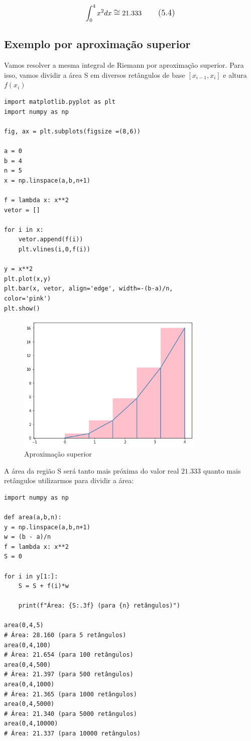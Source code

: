 \begin{equation}
\large \int_{0}^{4}x^2dx \cong 21.333
\tag{5.4}
\end{equation}

\subsection{Exemplo por aproximação superior}

Vamos resolver a mesma integral de Riemann por aproximação superior. Para isso, vamos dividir a área S em diversos retângulos de base $[x_{i-1},x_{i}]$ e altura $f(x_{i})$

\begin{verbatim}
import matplotlib.pyplot as plt
import numpy as np

fig, ax = plt.subplots(figsize =(8,6))

a = 0
b = 4
n = 5
x = np.linspace(a,b,n+1)

f = lambda x: x**2
vetor = []

for i in x:
	vetor.append(f(i))
	plt.vlines(i,0,f(i))

y = x**2
plt.plot(x,y)
plt.bar(x, vetor, align='edge', width=-(b-a)/n, 
color='pink')
plt.show()
\end{verbatim}

\begin{figure}[H]
	\centering
	\includegraphics[width=0.8\textwidth]{./Imagens/Integral de Riemann/RI3.png} 
	\caption{Aproximação superior}
	\label{fig:RI3}
\end{figure}

A área da região S será tanto mais próxima do valor real $21.333$ quanto mais retângulos utilizarmos para dividir a área:

\begin{verbatim}
import numpy as np

def area(a,b,n):
y = np.linspace(a,b,n+1)
w = (b - a)/n
f = lambda x: x**2
S = 0

for i in y[1:]:
	S = S + f(i)*w 
	
	print(f"Área: {S:.3f} (para {n} retângulos)")

area(0,4,5)
# Área: 28.160 (para 5 retângulos)
area(0,4,100)
# Área: 21.654 (para 100 retângulos)
area(0,4,500)
# Área: 21.397 (para 500 retângulos)
area(0,4,1000)
# Área: 21.365 (para 1000 retângulos)
area(0,4,5000)
# Área: 21.340 (para 5000 retângulos)
area(0,4,10000)
# Área: 21.337 (para 10000 retângulos)

\end{verbatim}

